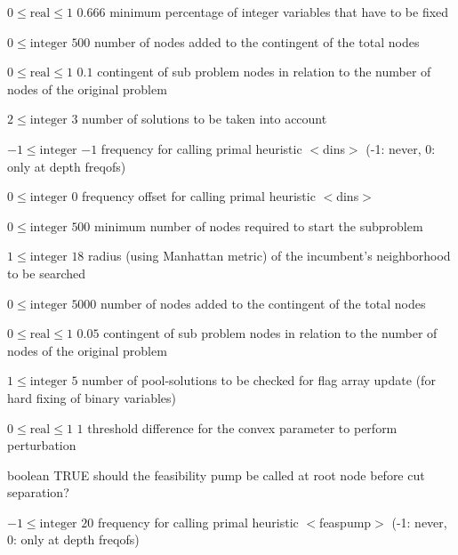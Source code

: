 %
{$0\leq\textrm{real}\leq1$}%
{$0.666$}%
{minimum percentage of integer variables that have to be fixed}%
{}

%
{$0\leq\textrm{integer}$}%
{$500$}%
{number of nodes added to the contingent of the total nodes}%
{}

%
{$0\leq\textrm{real}\leq1$}%
{$0.1$}%
{contingent of sub problem nodes in relation to the number of nodes of the original problem}%
{}

%
{$2\leq\textrm{integer}$}%
{$3$}%
{number of solutions to be taken into account}%
{}

%
{$-1\leq\textrm{integer}$}%
{$-1$}%
{frequency for calling primal heuristic $<$dins$>$ (-1: never, 0: only at depth freqofs)}%
{}

%
{$0\leq\textrm{integer}$}%
{$0$}%
{frequency offset for calling primal heuristic $<$dins$>$}%
{}

%
{$0\leq\textrm{integer}$}%
{$500$}%
{minimum number of nodes required to start the subproblem}%
{}

%
{$1\leq\textrm{integer}$}%
{$18$}%
{radius (using Manhattan metric) of the incumbent's neighborhood to be searched}%
{}

%
{$0\leq\textrm{integer}$}%
{$5000$}%
{number of nodes added to the contingent of the total nodes}%
{}

%
{$0\leq\textrm{real}\leq1$}%
{$0.05$}%
{contingent of sub problem nodes in relation to the number of nodes of the original problem}%
{}

%
{$1\leq\textrm{integer}$}%
{$5$}%
{number of pool-solutions to be checked for flag array update (for hard fixing of binary variables)}%
{}

%
{$0\leq\textrm{real}\leq1$}%
{$1$}%
{threshold difference for the convex parameter to perform perturbation}%
{}

%
{boolean}%
{TRUE}%
{should the feasibility pump be called at root node before cut separation?}%
{}

%
{$-1\leq\textrm{integer}$}%
{$20$}%
{frequency for calling primal heuristic $<$feaspump$>$ (-1: never, 0: only at depth freqofs)}%
{}

